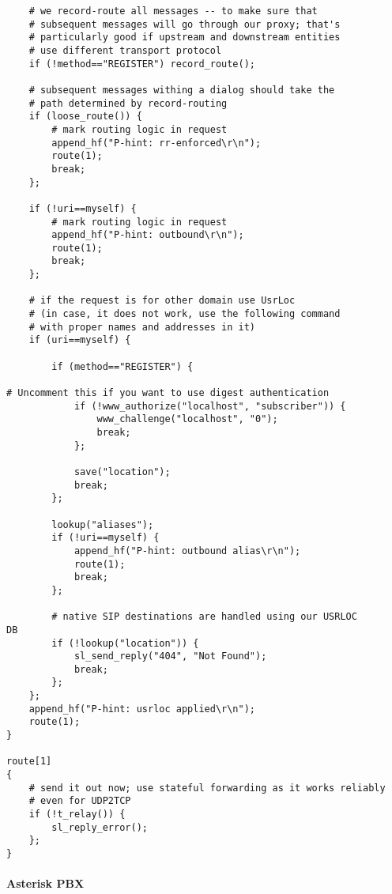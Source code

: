 \documentclass[a4paper,12pt]{report}
\newenvironment{myscriptlisting}
{\begin{list}{}{\setlength{\leftmargin}{1em}}\item\scriptsize\bfseries}
{\end{list}}
\begin{document}
\begin{myscriptlisting}
\begin{verbatim}
	# we record-route all messages -- to make sure that
	# subsequent messages will go through our proxy; that's
	# particularly good if upstream and downstream entities
	# use different transport protocol
	if (!method=="REGISTER") record_route();	

	# subsequent messages withing a dialog should take the
	# path determined by record-routing
	if (loose_route()) {
		# mark routing logic in request
		append_hf("P-hint: rr-enforced\r\n"); 
		route(1);
		break;
	};

	if (!uri==myself) {
		# mark routing logic in request
		append_hf("P-hint: outbound\r\n"); 
		route(1);
		break;
	};

	# if the request is for other domain use UsrLoc
	# (in case, it does not work, use the following command
	# with proper names and addresses in it)
	if (uri==myself) {

		if (method=="REGISTER") {

# Uncomment this if you want to use digest authentication
			if (!www_authorize("localhost", "subscriber")) {
				www_challenge("localhost", "0");
				break;
			};

			save("location");
			break;
		};

		lookup("aliases");
		if (!uri==myself) {
			append_hf("P-hint: outbound alias\r\n"); 
			route(1);
			break;
		};

		# native SIP destinations are handled using our USRLOC
DB
		if (!lookup("location")) {
			sl_send_reply("404", "Not Found");
			break;
		};
	};
	append_hf("P-hint: usrloc applied\r\n"); 
	route(1);
}

route[1] 
{
	# send it out now; use stateful forwarding as it works reliably
	# even for UDP2TCP
	if (!t_relay()) {
		sl_reply_error();
	};
}
 \end{verbatim}
\end{myscriptlisting}

\newpage

\paragraph{Asterisk PBX}
\end{document}

